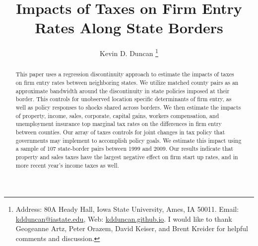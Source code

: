 \documentclass[12pt,a4paper]{article}
\renewcommand{\baselinestretch}{2}
\begin{document}
\title{Impacts of Taxes on Firm Entry Rates Along State Borders}
\author{Kevin D. Duncan \thanks{Address: 80A Heady Hall, Iowa State University, Ames, IA 50011. Email: \url{kdduncan@iastate.edu}, Web: \url{kdduncan.github.io}. I would like to thank Geogeanne Artz, Peter Orazem, David Keiser, and Brent Kreider for helpful comments and discussion.}}
\date{}
\maketitle

\begin{abstract}
This paper uses a regression discontinuity approach to estimate the impacts of taxes on firm entry rates between neighboring states. We utilize matched county pairs as an approximate bandwidth around the discontinuity in state policies imposed at their border. This controls for unobserved location specific determinants of firm entry, as well as policy responses to shocks shared across borders. We then estimate the impacts of property, income, sales, corporate, capital gains, workers compensation, and unemployment insurance top marginal tax rates on the differences in firm entry between counties. Our array of taxes controls for joint changes in tax policy that governments may implement to accomplish policy goals. We estimate this impact using a sample of 107 state-border pairs between 1999 and 2009. Our results indicate that property and sales taxes have the largest negative effect on firm start up rates, and in more recent year's income taxes as well.
\end{abstract}

\newpage







\renewcommand{\baselinestretch}{1} 
\end{document}

